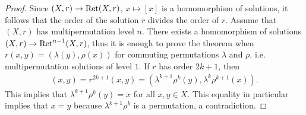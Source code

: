 \begin{proof}
    Since $(X,r)\to\operatorname{Ret}(X,r)$, $x\mapsto[x]$ is a homomorphism of solutions, 
    it follows that the order of the solution $\overline{r}$ divides the order of $r$. 
    Assume that $(X,r)$ has multipermutation level $n$. 
    There exists a homomorphism of solutions $(X,r)\to\operatorname{Ret}^{n-1}(X,r)$, thus 
    it is enough to prove the theorem when
    $r(x,y)=(\lambda(y),\rho(x))$ for commuting permutations $\lambda$ and $\rho$, i.e. 
    multipermutation solutions of level $1$. If $r$ has order $2k+1$, then 
    \begin{align*}
        (x,y)=r^{2k+1}(x,y)=(\lambda^{k+1}\rho^k(y),\lambda^k\rho^{k+1}(x)).
    \end{align*}
    This implies that $\lambda^{k+1}\rho^k(y)=x$ for all $x,y\in X$. This equality in particular 
    implies that $x=y$ because $\lambda^{k+1}\rho^k$ is a permutation, a contradiction. 
\end{proof}


